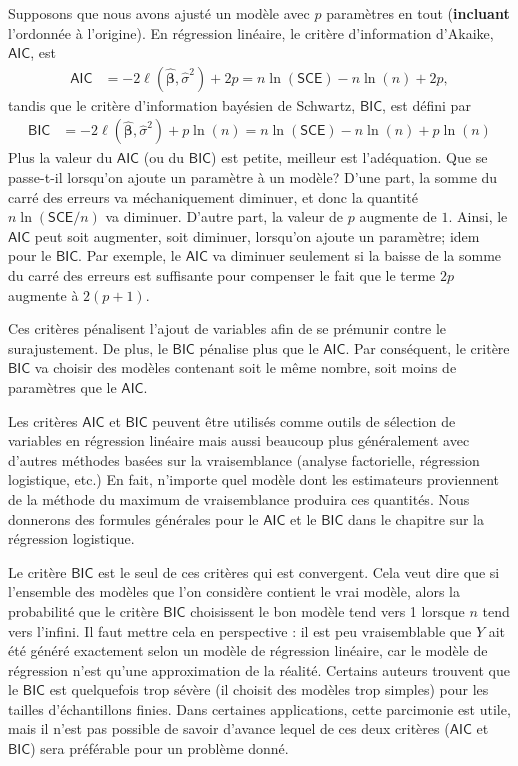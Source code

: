 \documentclass[
  11pt,
  letterpaper,
]{book}
\theoremstyle{definition}
\theoremstyle{definition}
\theoremstyle{definition}
\theoremstyle{remark}
\begin{document}
Supposons que nous avons ajusté un modèle avec \(p\) paramètres en tout (\textbf{incluant} l'ordonnée à l'origine). En régression linéaire, le critère d'information d'Akaike, \(\mathsf{AIC}\), est
\begin{align*}
\mathsf{AIC} &=-2 \ell(\widehat{\boldsymbol{\beta}}, \widehat{\sigma}^2) +2p=n \ln (\mathsf{SCE}) - n\ln(n) + 2p,
\end{align*}
tandis que le critère d'information bayésien de Schwartz, \(\mathsf{BIC}\), est défini par
\begin{align*}
\mathsf{BIC} &=-2 \ell(\widehat{\boldsymbol{\beta}}, \widehat{\sigma}^2) + p\ln(n)=n \ln (\mathsf{SCE}) - n\ln(n) + p\ln(n)
\end{align*}
Plus la valeur du \(\mathsf{AIC}\) (ou du \(\mathsf{BIC}\)) est petite, meilleur est l'adéquation. Que se passe-t-il lorsqu'on ajoute un paramètre à un modèle? D'une part, la somme du carré des erreurs va méchaniquement diminuer, et donc la quantité \(n \ln (\mathsf{SCE}/n)\) va diminuer. D'autre part, la valeur de \(p\) augmente de \(1\). Ainsi, le \(\mathsf{AIC}\) peut soit augmenter, soit diminuer, lorsqu'on ajoute un paramètre; idem pour le \(\mathsf{BIC}\). Par exemple, le \(\mathsf{AIC}\) va diminuer seulement si la baisse de la somme du carré des erreurs est suffisante pour compenser le fait que le terme \(2p\) augmente à \(2 (p+1)\).

Ces critères pénalisent l'ajout de variables afin de se prémunir contre le surajustement. De plus, le \(\mathsf{BIC}\) pénalise plus que le \(\mathsf{AIC}\). Par conséquent, le critère \(\mathsf{BIC}\) va choisir des modèles contenant soit le même nombre, soit moins de paramètres que le \(\mathsf{AIC}\).

Les critères \(\mathsf{AIC}\) et \(\mathsf{BIC}\) peuvent être utilisés comme outils de sélection de variables en régression linéaire mais aussi beaucoup plus généralement avec d'autres méthodes basées sur la vraisemblance (analyse factorielle, régression logistique, etc.) En fait, n'importe quel modèle dont les estimateurs proviennent de la méthode du maximum de vraisemblance produira ces quantités. Nous donnerons des formules générales pour le \(\mathsf{AIC}\) et le \(\mathsf{BIC}\) dans le chapitre sur la régression logistique.

Le critère \(\mathsf{BIC}\) est le seul de ces critères qui est convergent. Cela veut dire que si l'ensemble des modèles que l'on considère contient le vrai modèle, alors la probabilité que le critère \(\mathsf{BIC}\) choisissent le bon modèle tend vers 1 lorsque \(n\) tend vers l'infini. Il faut mettre cela en perspective : il est peu vraisemblable que \(Y\) ait été généré exactement selon un modèle de régression linéaire, car le modèle de régression n'est qu'une approximation de la réalité. Certains auteurs trouvent que le \(\mathsf{BIC}\) est quelquefois trop sévère (il choisit des modèles trop simples) pour les tailles d'échantillons finies. Dans certaines applications, cette parcimonie est utile, mais il n'est pas possible de savoir d'avance lequel de ces deux critères (\(\mathsf{AIC}\) et \(\mathsf{BIC}\)) sera préférable pour un problème donné.
\end{document}
